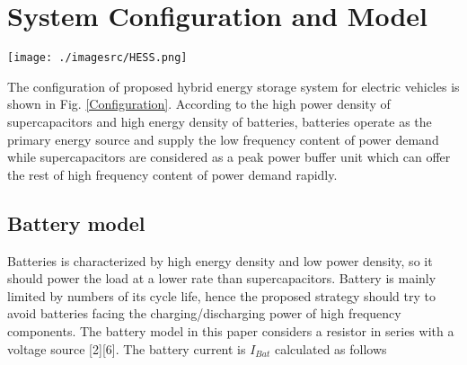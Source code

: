 \documentclass[energies,article,submit,moreauthors,pdftex,10pt,a4paper]{Definitions/mdpi}
\begin{document}
\section{System Configuration  and Model }

\begin{figure*}[!t]
\centering
\texttt{[image: ./imagesrc/HESS.png]}
\caption{Configuration of the proposed hybrid energy management system for the electric vehicle.}
\label{Configuration}
\end{figure*}
The configuration of proposed hybrid energy storage system for electric vehicles is shown in Fig. \ref{Configuration}.
%
According to the high power density of supercapacitors and high energy density of batteries, batteries operate as the primary energy source and supply the low frequency content of power demand while supercapacitors are considered as a peak power buffer unit which can offer the rest of  high frequency content of power demand rapidly.


\subsection{Battery model}

Batteries is characterized by high energy density and low power density, so it should power the load at a lower rate than supercapacitors. Battery is mainly limited by numbers of its cycle life, hence the proposed strategy should try to avoid batteries facing the charging/discharging power of high frequency components.
The battery model in this paper considers a resistor in series with a voltage source [2][6]. The battery current is ${I_{Bat}}$ calculated as follows 
\end{document}
